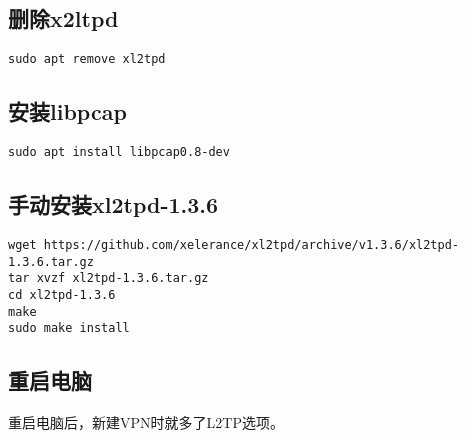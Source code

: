 \documentclass[a4paper,left=2.5cm,right=2.5cm,11pt]{article}
\begin{document}
\subsection{删除x2ltpd}
\begin{lstlisting}
sudo apt remove xl2tpd 
\end{lstlisting}

\subsection{安装libpcap}
\begin{lstlisting}
sudo apt install libpcap0.8-dev
\end{lstlisting}

\subsection{手动安装xl2tpd-1.3.6}
\begin{lstlisting}
wget https://github.com/xelerance/xl2tpd/archive/v1.3.6/xl2tpd-1.3.6.tar.gz  
tar xvzf xl2tpd-1.3.6.tar.gz  
cd xl2tpd-1.3.6  
make  
sudo make install
\end{lstlisting}

\subsection{重启电脑}
    重启电脑后，新建VPN时就多了L2TP选项。
\end{document}
